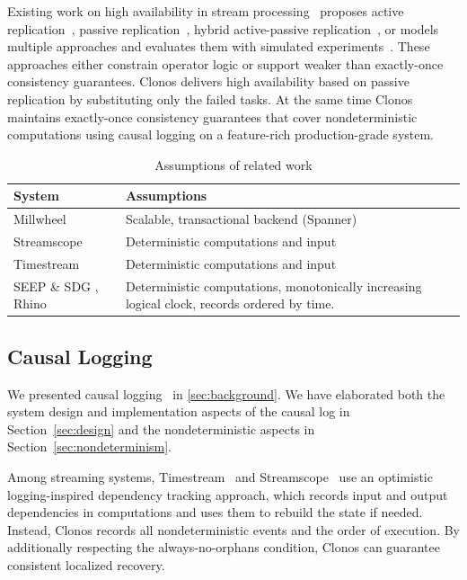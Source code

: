 \documentclass[sigconf]{acmart}
\begin{document}
Existing work on high availability in stream processing~\cite{Hwang2005HAA} proposes active replication~\cite{BalazinskaBM05, Shah2004highly}, passive replication~\cite{HwangX07, KwonB08}, hybrid active-passive replication~\cite{HeinzeZ15, SuZ16}, or models multiple approaches and evaluates them with simulated experiments~\cite{ChandramouliG17, Hwang2005HAA}. These approaches either constrain operator logic or support weaker than exactly-once consistency guarantees.
Clonos delivers high availability based on passive replication by substituting only the failed tasks. At the same time Clonos maintains exactly-once consistency guarantees that cover nondeterministic computations using causal logging on a feature-rich production-grade system.


\begin{table}[t]
  \caption{Assumptions of related work}
  \label{tab:determinism-assumptions}
  \vspace{-2.5mm}
  \small
  \begin{tabular}{p{}|p{}}
      \toprule
      \textbf{System} & \textbf{Assumptions} \\
      \bottomrule\toprule
      Millwheel \cite{akidau2013millwheel} & Scalable, transactional backend (Spanner) \\ \hline
      Streamscope \cite{LinHZ16} & Deterministic computations and input \\\hline
      Timestream \cite{QianHS13} & Deterministic computations and input \\\hline
      SEEP \& SDG \cite{FernandezMK14}, Rhino \cite{delmonte2020rhino} & Deterministic computations, monotonically increasing logical clock, records ordered by time.\\\bottomrule
      \toprule
  \end{tabular}
\end{table}

\subsection{Causal Logging}

We presented causal logging~\cite{elnozahy1994manetho, elnozahy2002survey}  in \autoref{sec:background}. 
We have elaborated both the system design and implementation aspects of the causal log in Section~\ref{sec:design} and the nondeterministic aspects in Section~\ref{sec:nondeterminism}.

Among streaming systems, Timestream~\cite{QianHS13} and Streamscope~\cite{LinHZ16} use an optimistic logging-inspired dependency tracking approach, which records input and output dependencies in computations and uses them to rebuild the state if needed.
Instead, Clonos records all nondeterministic events and the order of execution. By additionally respecting the always-no-orphans condition, Clonos can guarantee consistent localized recovery.
\end{document}

